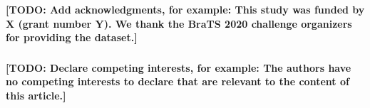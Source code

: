 \begin{credits}
\subsubsection{\ackname}
\textbf{[TODO: Add acknowledgments, for example: This study was funded by X (grant number Y). We thank the BraTS 2020 challenge organizers for providing the dataset.]}

\subsubsection{\discintname}
\textbf{[TODO: Declare competing interests, for example: The authors have no competing interests to declare that are relevant to the content of this article.]}
\end{credits}
